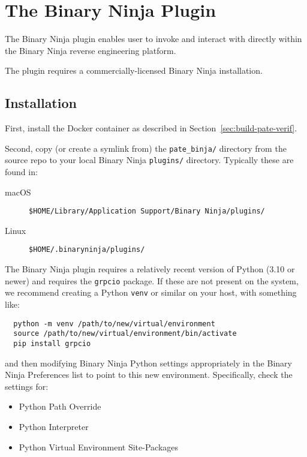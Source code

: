 \section{The \pate{} Binary Ninja Plugin}
\label{sec:binary-ninja-ui}

The \pate{} Binary Ninja plugin enables user to invoke and interact with \pate{} directly within the Binary Ninja reverse engineering platform.

The \pate{} plugin requires a commercially-licensed Binary Ninja installation.

\subsection{Installation}

First, install the \pate{} Docker container as described in Section~\ref{sec:build-pate-verif}.

Second, copy (or create a symlink from) the \texttt{pate\_binja/} directory from the \pate{} source repo to your local Binary Ninja \texttt{plugins/} directory. Typically these are found in:
\begin{description}
\item[macOS] \texttt{\$HOME/Library/Application Support/Binary Ninja/plugins/}
\item[Linux] \texttt{\$HOME/.binaryninja/plugins/}
\end{description}

The Binary Ninja plugin requires a relatively recent version of Python (3.10 or newer) and requires the \texttt{grpcio} package.
If these are not present on the system, we recommend creating a Python \texttt{venv} or similar on your host, with something like:

\begin{verbatim}
  python -m venv /path/to/new/virtual/environment
  source /path/to/new/virtual/environment/bin/activate
  pip install grpcio
\end{verbatim}

and then modifying Binary Ninja Python settings appropriately in the Binary Ninja Preferences list to point to this new environment.
Specifically, check the settings for:

\begin{itemize}
    \item Python Path Override
    \item Python Interpreter
    \item Python Virtual Environment Site-Packages
\end{itemize}

